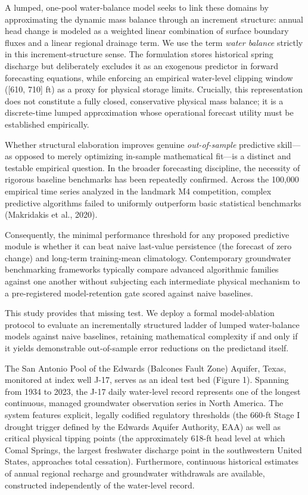 \documentclass[11pt]{article}
\begin{document}
A lumped, one-pool water-balance model seeks to link these domains by
approximating the dynamic mass balance through an increment structure:
annual head change is modeled as a weighted linear combination of
surface boundary fluxes and a linear regional drainage term. We use the
term \emph{water balance} strictly in this increment-structure sense.
The formulation stores historical spring discharge but deliberately
excludes it as an exogenous predictor in forward forecasting equations,
while enforcing an empirical water-level clipping window ({[}610, 710{]}
ft) as a proxy for physical storage limits. Crucially, this
representation does not constitute a fully closed, conservative physical
mass balance; it is a discrete-time lumped approximation whose
operational forecast utility must be established empirically.

Whether structural elaboration improves genuine \emph{out-of-sample}
predictive skill---as opposed to merely optimizing in-sample
mathematical fit---is a distinct and testable empirical question. In the
broader forecasting discipline, the necessity of rigorous baseline
benchmarks has been repeatedly confirmed. Across the 100,000 empirical
time series analyzed in the landmark M4 competition, complex predictive
algorithms failed to uniformly outperform basic statistical benchmarks
(Makridakis et al., 2020).

Consequently, the minimal performance threshold for any proposed
predictive module is whether it can beat naive last-value persistence
(the forecast of zero change) and long-term training-mean climatology.
Contemporary groundwater benchmarking frameworks typically compare
advanced algorithmic families against one another without subjecting
each intermediate physical mechanism to a pre-registered model-retention
gate scored against naive baselines.

This study provides that missing test. We deploy a formal model-ablation
protocol to evaluate an incrementally structured ladder of lumped
water-balance models against naive baselines, retaining mathematical
complexity if and only if it yields demonstrable out-of-sample error
reductions on the predictand itself.

The San Antonio Pool of the Edwards (Balcones Fault Zone) Aquifer,
Texas, monitored at index well J-17, serves as an ideal test bed (Figure
1). Spanning from 1934 to 2023, the J-17 daily water-level record
represents one of the longest continuous, managed groundwater
observation series in North America. The system features explicit,
legally codified regulatory thresholds (the 660-ft Stage I drought
trigger defined by the Edwards Aquifer Authority, EAA) as well as
critical physical tipping points (the approximately 618-ft head level at
which Comal Springs, the largest freshwater discharge point in the
southwestern United States, approaches total cessation). Furthermore,
continuous historical estimates of annual regional recharge and
groundwater withdrawals are available, constructed independently of the
water-level record.
\end{document}
